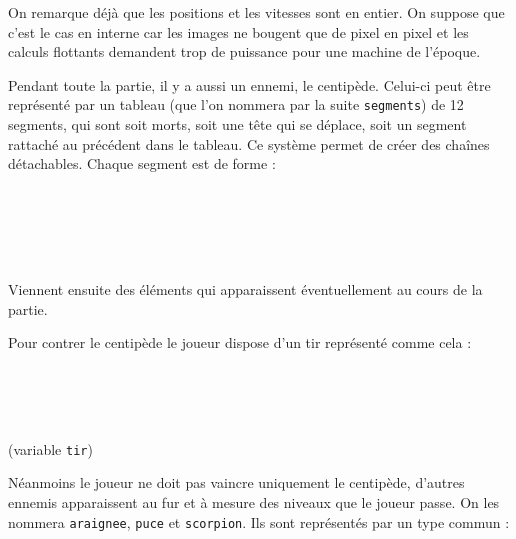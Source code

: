 On remarque déjà que les positions et les vitesses sont en entier. On suppose que c'est le cas en interne car les images ne bougent que de pixel en pixel et les calculs flottants demandent trop de puissance pour une machine de l'époque.

Pendant toute la partie, il y a aussi un ennemi, le centipède. Celui-ci peut être représenté par un tableau (que l'on nommera par la suite \texttt{segments}) de 12 segments, qui sont soit morts, soit une tête qui se déplace, soit un segment rattaché au précédent dans le tableau. Ce système permet de créer des chaînes détachables. Chaque segment est de forme :

\begin{typeag}[Segment]
        \\
        \\
        \\
        \\
\end{typeag}

Viennent ensuite des éléments qui apparaissent éventuellement au cours de la partie.

Pour contrer le centipède le joueur dispose d'un tir représenté comme cela : 

\begin{typeag}[Projectile]
        \\
        \\
        \\
\end{typeag} (variable \texttt{tir})

Néanmoins le joueur ne doit pas vaincre uniquement le centipède, d'autres ennemis apparaissent au fur et à mesure des niveaux que le joueur passe. On les nommera \texttt{araignee}, \texttt{puce} et \texttt{scorpion}. Ils sont représentés par un type commun : 


